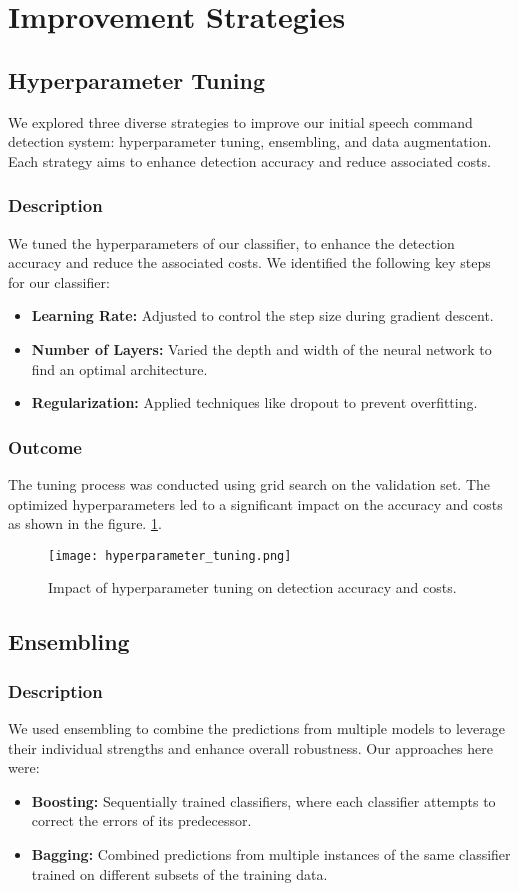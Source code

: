 \section{Improvement Strategies}
\subsection{Hyperparameter Tuning}
We explored three diverse strategies to improve our initial speech command detection system: hyperparameter tuning, ensembling, and data augmentation. Each strategy aims to enhance detection accuracy and reduce associated costs.
\subsubsection{Description}
We tuned the hyperparameters of our classifier, to enhance the detection accuracy and reduce the associated costs. We identified the following key steps for our classifier:
\begin{itemize}
  \item \textbf{Learning Rate:} Adjusted to control the step size during gradient descent.
  \item \textbf{Number of Layers:} Varied the depth and width of the neural network to find an optimal architecture.
  \item \textbf{Regularization:} Applied techniques like dropout to prevent overfitting.
\end{itemize}


\subsubsection{Outcome}
The tuning process was conducted using grid search on the validation set. The optimized hyperparameters led to a significant impact on the accuracy and costs as shown in the figure.
\ref{fig:hyperparameter_tuning}.

\begin{figure}[h]
\centering
\texttt{[image: hyperparameter\_tuning.png]}
\caption{Impact of hyperparameter tuning on detection accuracy and costs.}
\label{fig:hyperparameter_tuning}
\end{figure}

\subsection{Ensembling}
\subsubsection{Description}
We used ensembling to combine the predictions from multiple models to leverage their individual strengths and enhance overall robustness. Our approaches here were:
\begin{itemize}
  \item \textbf{Boosting:} Sequentially trained classifiers, where each classifier attempts to correct the errors of its predecessor.
  \item \textbf{Bagging:} Combined predictions from multiple instances of the same classifier trained on different subsets of the training data.
\end{itemize}

